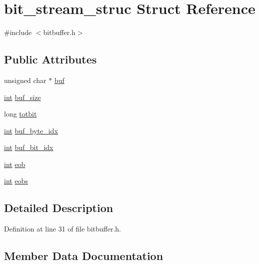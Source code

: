 \hypertarget{structbit__stream__struc}{}\section{bit\+\_\+stream\+\_\+struc Struct Reference}
\label{structbit__stream__struc}


{\ttfamily \#include $<$bitbuffer.\+h$>$}

\subsection*{Public Attributes}
\begin{DoxyCompactItemize}
\item 
unsigned char $\ast$ \hyperlink{structbit__stream__struc_aa9bc37a08d818a5edf70a98a3dc055e1}{buf}
\item 
\hyperlink{xmltok_8h_a5a0d4a5641ce434f1d23533f2b2e6653}{int} \hyperlink{structbit__stream__struc_a4bfbcb5b5005121a94a234988f5ae178}{buf\+\_\+size}
\item 
long \hyperlink{structbit__stream__struc_a0f1aba65586563150618183b07d75af1}{totbit}
\item 
\hyperlink{xmltok_8h_a5a0d4a5641ce434f1d23533f2b2e6653}{int} \hyperlink{structbit__stream__struc_a17135b83b424387b48a0db32666a22e1}{buf\+\_\+byte\+\_\+idx}
\item 
\hyperlink{xmltok_8h_a5a0d4a5641ce434f1d23533f2b2e6653}{int} \hyperlink{structbit__stream__struc_a3b53a2a5ee2f6bb60897873289e7fab9}{buf\+\_\+bit\+\_\+idx}
\item 
\hyperlink{xmltok_8h_a5a0d4a5641ce434f1d23533f2b2e6653}{int} \hyperlink{structbit__stream__struc_af93e9848b03317dcb18f9694b44b90ca}{eob}
\item 
\hyperlink{xmltok_8h_a5a0d4a5641ce434f1d23533f2b2e6653}{int} \hyperlink{structbit__stream__struc_a432bb903be1b63d58d0541a212098af5}{eobs}
\end{DoxyCompactItemize}


\subsection{Detailed Description}


Definition at line 31 of file bitbuffer.\+h.



\subsection{Member Data Documentation}
